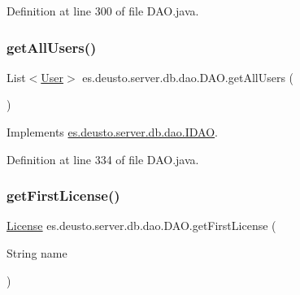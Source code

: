 Definition at line 300 of file D\+A\+O.\+java.

\mbox{\label{classes_1_1deusto_1_1server_1_1db_1_1dao_1_1_d_a_o_a9c59f6c4bf89f46e305f88a4f8eb96bc}} 
\subsubsection{\texorpdfstring{get\+All\+Users()}{getAllUsers()}}
{\footnotesize\ttfamily List$<$\hyperlink{classes_1_1deusto_1_1server_1_1db_1_1data_1_1_user}{User}$>$ es.\+deusto.\+server.\+db.\+dao.\+D\+A\+O.\+get\+All\+Users (\begin{DoxyParamCaption}{ }\end{DoxyParamCaption})}



Implements \hyperlink{interfacees_1_1deusto_1_1server_1_1db_1_1dao_1_1_i_d_a_o_a3786445c689f73ccd693c57a629c02de}{es.\+deusto.\+server.\+db.\+dao.\+I\+D\+AO}.



Definition at line 334 of file D\+A\+O.\+java.

\mbox{\label{classes_1_1deusto_1_1server_1_1db_1_1dao_1_1_d_a_o_a4a5a54059bac00ea6f3b6d21f2a31a02}} 
\subsubsection{\texorpdfstring{get\+First\+License()}{getFirstLicense()}}
{\footnotesize\ttfamily \hyperlink{classes_1_1deusto_1_1server_1_1db_1_1data_1_1_license}{License} es.\+deusto.\+server.\+db.\+dao.\+D\+A\+O.\+get\+First\+License (\begin{DoxyParamCaption}\item[{String}]{name }\end{DoxyParamCaption})}



